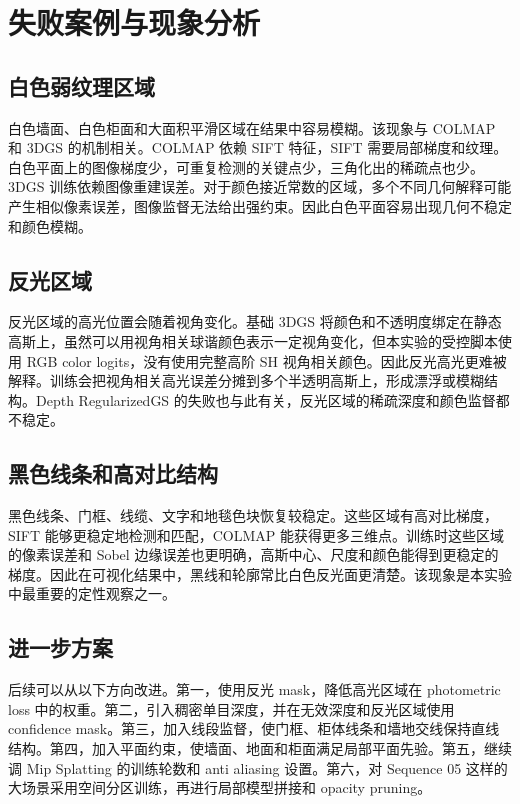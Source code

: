 \documentclass[UTF8,a4paper,11pt]{ctexart}
\begin{document}
\section{失败案例与现象分析}

\subsection{白色弱纹理区域}

白色墙面、白色柜面和大面积平滑区域在结果中容易模糊。该现象与 COLMAP 和 3DGS 的机制相关。COLMAP 依赖 SIFT 特征，SIFT 需要局部梯度和纹理。白色平面上的图像梯度少，可重复检测的关键点少，三角化出的稀疏点也少。3DGS 训练依赖图像重建误差。对于颜色接近常数的区域，多个不同几何解释可能产生相似像素误差，图像监督无法给出强约束。因此白色平面容易出现几何不稳定和颜色模糊。

\subsection{反光区域}

反光区域的高光位置会随着视角变化。基础 3DGS 将颜色和不透明度绑定在静态高斯上，虽然可以用视角相关球谐颜色表示一定视角变化，但本实验的受控脚本使用 RGB color logits，没有使用完整高阶 SH 视角相关颜色。因此反光高光更难被解释。训练会把视角相关高光误差分摊到多个半透明高斯上，形成漂浮或模糊结构。Depth RegularizedGS 的失败也与此有关，反光区域的稀疏深度和颜色监督都不稳定。

\subsection{黑色线条和高对比结构}

黑色线条、门框、线缆、文字和地毯色块恢复较稳定。这些区域有高对比梯度，SIFT 能够更稳定地检测和匹配，COLMAP 能获得更多三维点。训练时这些区域的像素误差和 Sobel 边缘误差也更明确，高斯中心、尺度和颜色能得到更稳定的梯度。因此在可视化结果中，黑线和轮廓常比白色反光面更清楚。该现象是本实验中最重要的定性观察之一。

\subsection{进一步方案}

后续可以从以下方向改进。第一，使用反光 mask，降低高光区域在 photometric loss 中的权重。第二，引入稠密单目深度，并在无效深度和反光区域使用 confidence mask。第三，加入线段监督，使门框、柜体线条和墙地交线保持直线结构。第四，加入平面约束，使墙面、地面和柜面满足局部平面先验。第五，继续调 Mip Splatting 的训练轮数和 anti aliasing 设置。第六，对 Sequence 05 这样的大场景采用空间分区训练，再进行局部模型拼接和 opacity pruning。
\end{document}
